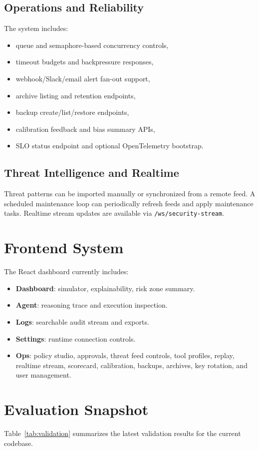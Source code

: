 \documentclass[conference]{IEEEtran}
\begin{document}
\subsection{Operations and Reliability}
The system includes:
\begin{itemize}
    \item queue and semaphore-based concurrency controls,
    \item timeout budgets and backpressure responses,
    \item webhook/Slack/email alert fan-out support,
    \item archive listing and retention endpoints,
    \item backup create/list/restore endpoints,
    \item calibration feedback and bias summary APIs,
    \item SLO status endpoint and optional OpenTelemetry bootstrap.
\end{itemize}

\subsection{Threat Intelligence and Realtime}
Threat patterns can be imported manually or synchronized from a remote feed. A scheduled maintenance loop can periodically refresh feeds and apply maintenance tasks. Realtime stream updates are available via \texttt{/ws/security-stream}.

\section{Frontend System}
The React dashboard currently includes:
\begin{itemize}
    \item \textbf{Dashboard}: simulator, explainability, risk zone summary.
    \item \textbf{Agent}: reasoning trace and execution inspection.
    \item \textbf{Logs}: searchable audit stream and exports.
    \item \textbf{Settings}: runtime connection controls.
    \item \textbf{Ops}: policy studio, approvals, threat feed controls, tool profiles, replay, realtime stream, scorecard, calibration, backups, archives, key rotation, and user management.
\end{itemize}

\section{Evaluation Snapshot}
Table~\ref{tab:validation} summarizes the latest validation results for the current codebase.
\end{document}
